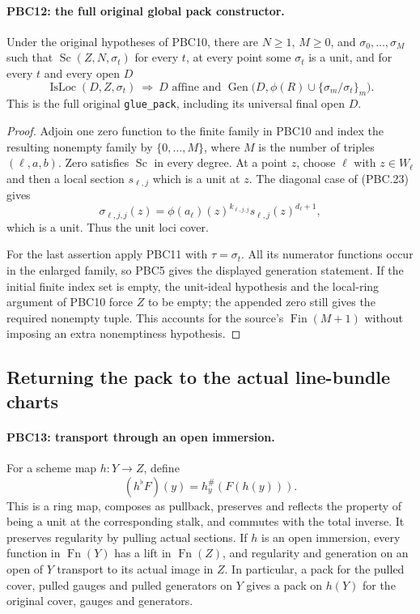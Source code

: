 \paragraph{PBC12: the full original global pack constructor.}
\label{claim:PBC12}
Under the original hypotheses of PBC10, there are $N\ge1$,
$M\ge0$, and $\sigma_0,\ldots,\sigma_M$ such that
$\operatorname{Sc}(Z,N,\sigma_t)$ for every $t$, at every point
some $\sigma_t$ is a unit, and for every $t$ and every open $D$
\[
 \operatorname{IsLoc}(D,Z,\sigma_t)
 \ \Longrightarrow\
 D\text{ affine and }
 \operatorname{Gen}\bigl(D,\phi(R)\cup\{\sigma_m/\sigma_t\}_m\bigr).
                                                        \tag{PBC.26}
\]
This is the full original \texttt{glue\_pack}, including its
universal final open $D$.

\begin{proof}
Adjoin one zero function to the finite family in PBC10 and index
the resulting nonempty family by
$\{0,\ldots,M\}$, where $M$ is the number of triples
$(\ell,a,b)$.  Zero satisfies $\operatorname{Sc}$ in every degree.
At a point $z$, choose $\ell$ with $z\in W_\ell$ and then a local
section $s_{\ell,j}$ which is a unit at $z$.  The diagonal case
of (PBC.23) gives
\[
 \sigma_{\ell,j,j}(z)
   =\phi(a_\ell)(z)^{k_{\ell,j,j}}
                     s_{\ell,j}(z)^{d_\ell+1},
\]
which is a unit.  Thus the unit loci cover.

For the last assertion apply PBC11 with $\tau=\sigma_t$.
All its numerator functions occur in the enlarged family,
so PBC5 gives the displayed generation statement.
If the initial finite index set is empty, the unit-ideal
hypothesis and the local-ring argument of PBC10 force $Z$ to be
empty; the appended zero still gives the required nonempty tuple.
This accounts for the source's $\operatorname{Fin}(M+1)$
without imposing an extra nonemptiness hypothesis.
\end{proof}

\subsection{Returning the pack to the actual line-bundle charts}

\paragraph{PBC13: transport through an open immersion.}
\label{claim:PBC13}
For a scheme map $h:Y\to Z$, define
\[
 (h^\flat F)(y)=h_y^\#(F(h(y))).
                                                        \tag{PBC.27}
\]
This is a ring map, composes as pullback, preserves and reflects
the property of being a unit at the corresponding stalk, and
commutes with the total inverse.  It preserves regularity by
pulling actual sections.  If $h$ is an open immersion, every
function in $\operatorname{Fn}(Y)$ has a lift in
$\operatorname{Fn}(Z)$, and regularity and generation on an open
of $Y$ transport to its actual image in $Z$.
In particular, a pack for the pulled cover, pulled gauges and
pulled generators on $Y$ gives a pack on $h(Y)$ for the original
cover, gauges and generators.

